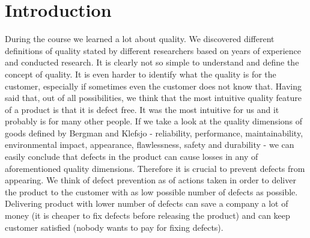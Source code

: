 \section{Introduction}
During the course we learned a lot about quality. We discovered different definitions of quality stated by different researchers based on years of experience and conducted research. It is clearly not so simple to understand and define the concept of quality. It is even harder to identify what the quality is for the customer, especially if sometimes even the customer does not know that. Having said that, out of all possibilities, we think that the most intuitive quality feature of a product is that it is defect free. It was the most intuitive for us and it probably is for many other people. If we take a look at the quality dimensions of goods defined by Bergman and Klefsjo\cite{bergman} - reliability, performance, maintainability, environmental impact, appearance, flawlessness, safety and durability - we can easily conclude that defects in the product can cause losses in any of aforementioned quality dimensions. Therefore it is crucial to prevent defects from appearing. We think of defect prevention as of actions taken in order to deliver the product to the customer with as low possible number of defects as possible. Delivering product with lower number of defects can save a company a lot of money (it is cheaper to fix defects before releasing the product) and can keep customer satisfied (nobody wants to pay for fixing defects). 
